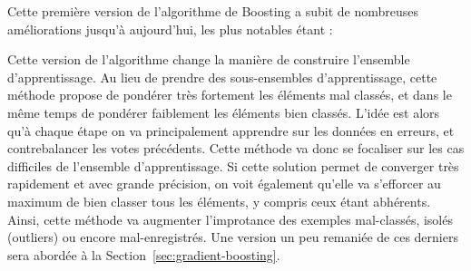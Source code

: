 Cette première version de l'algorithme de Boosting a subit de nombreuses améliorations jusqu'à aujourd'hui, les plus notables étant :
\begin{itemize}
	Cette version de l'algorithme change la manière de construire l'ensemble d'apprentissage. Au lieu de prendre des sous-ensembles d'apprentissage, cette méthode propose de pondérer très fortement les éléments mal classés, et dans le même temps de pondérer faiblement les éléments bien classés. L'idée est alors qu'à chaque étape on va principalement apprendre sur les données en erreurs, et contrebalancer les votes précédents. Cette méthode va donc se focaliser sur les cas \og difficiles\fg{} de l'ensemble d'apprentissage. Si cette solution permet de converger très rapidement et avec grande précision, on voit également qu'elle va s'efforcer au maximum de bien classer tous les éléments, y compris ceux étant abhérents. Ainsi, cette méthode va augmenter l'improtance des exemples mal-classés, isolés (outliers) ou encore mal-enregistrés.
	Une version un peu remaniée de ces derniers sera abordée à la Section~\ref{sec:gradient-boosting}.
\end{itemize}